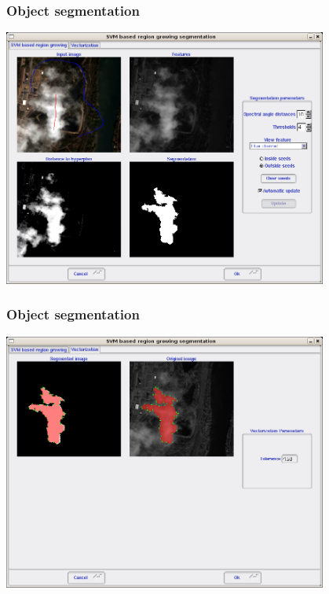 \documentclass[compress]{beamer}
\begin{document}
\begin{frame}
  \frametitle{Object segmentation}
      \begin{center}
      \includegraphics[width=0.80\textwidth]{Images/seg12.png}
  \end{center}
\end{frame}

\begin{frame}
  \frametitle{Object segmentation}
      \begin{center}
      \includegraphics[width=0.80\textwidth]{Images/seg13.png}
  \end{center}
\end{frame}
\end{document}
